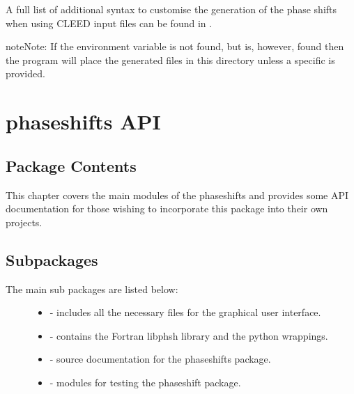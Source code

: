 \documentclass[letterpaper,10pt,english]{sphinxmanual}
\begin{document}
A full list of additional syntax to customise the generation of the phase shifts
when using CLEED input files can be found in
{\hyperref[modules:phaseshifts.leed.Converter.import_CLEED]{}}.

\begin{notice}{note}{Note:}
If the  environment variable is not found, but
 is, however, found then the program will place the generated
files in this directory unless a specific  is provided.
\end{notice}


\chapter{phaseshifts API}
\label{modules:phaseshifts-api}\label{modules:api}\label{modules::doc}

\section{Package Contents}
\label{modules:package-contents}
This chapter covers the main modules of the phaseshifts and provides some API documentation
for those wishing to incorporate this package into their own projects.
\label{modules:module-phaseshifts}

\section{Subpackages}
\label{modules:subpackages}\begin{description}
\item[{The main sub packages are listed below:}] \leavevmode\begin{itemize}
\item {} 
 - includes all the necessary files for the graphical user interface.

\item {} 
 - contains the Fortran libphsh library and the python wrappings.

\item {} 
 - source documentation for the phaseshifts package.

\item {} 
 - modules for testing the phaseshift package.

\end{itemize}

\end{description}
\end{document}
